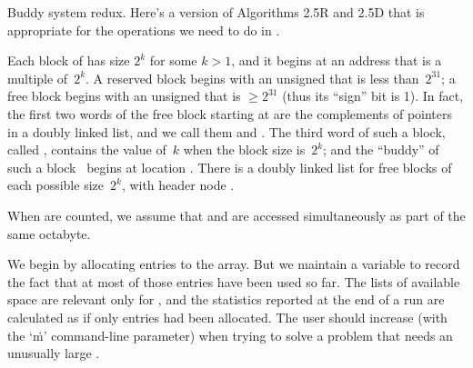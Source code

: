 Buddy system redux. Here's a version of Algorithms 2.5R and 2.5D that
is appropriate for the operations we need to do in .

Each block of  has size $2^k$ for some $k>1$, and it begins at
an address that is a multiple of~$2^k$. A reserved block begins with
an unsigned  that is less than~$2^{31}$; a free block begins with
an unsigned  that is $\ge2^{31}$ (thus its ``sign'' bit is 1).
In fact, the first two words of the free block starting at  are
the complements of pointers in a doubly linked list, and we call them
 and . The third word of such a block, called ,
contains the value of~$k$ when the block size is~$2^k$; and the
``buddy'' of such a block~ begins at location .
There is a doubly linked list for free blocks of
each possible size~$2^k$, with header node .

When  are counted, we assume that  and  are
accessed simultaneously as part of the same octabyte.

We begin by allocating  entries to the 
array.
But we maintain a variable  to record the fact that
at most  of those entries have been used so far.
The lists of available space are relevant only for ,
and the statistics reported at the end of a run are calculated
as if only  entries had been allocated. The user should
increase  (with the `\.m' command-line parameter) when trying
to
solve a problem that needs an unusually large .


